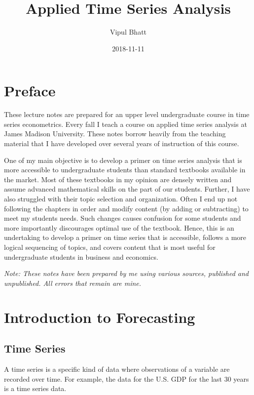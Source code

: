 \documentclass[]{book}
\title{Applied Time Series Analysis}
\author{Vipul Bhatt}
\date{2018-11-11}
\theoremstyle{definition}
\theoremstyle{definition}
\theoremstyle{definition}
\theoremstyle{remark}
\begin{document}
\maketitle

{
\setcounter{tocdepth}{1}
\tableofcontents
}
\hypertarget{preface}{%
\chapter*{Preface}\label{preface}}

These lecture notes are prepared for an upper level undergraduate course
in time series econometrics. Every fall I teach a course on applied time
series analysis at James Madison University. These notes borrow heavily
from the teaching material that I have developed over several years of
instruction of this course.

One of my main objective is to develop a primer on time series analysis
that is more accessible to undergraduate students than standard
textbooks available in the market. Most of these textbooks in my opinion
are densely written and assume advanced mathematical skills on the part
of our students. Further, I have also struggled with their topic
selection and organization. Often I end up not following the chapters in
order and modify content (by adding or subtracting) to meet my students
needs. Such changes causes confusion for some students and more
importantly discourages optimal use of the textbook. Hence, this is an
undertaking to develop a primer on time series that is accessible,
follows a more logical sequencing of topics, and covers content that is
most useful for undergraduate students in business and economics.

\emph{Note: These notes have been prepared by me using various sources,
published and unpublished. All errors that remain are mine.}

\hypertarget{intro}{%
\chapter{Introduction to Forecasting}\label{intro}}

\hypertarget{time-series}{%
\section{Time Series}\label{time-series}}

A time series is a specific kind of data where observations of a
variable are recorded over time. For example, the data for the U.S. GDP
for the last 30 years is a time series data.
\end{document}
